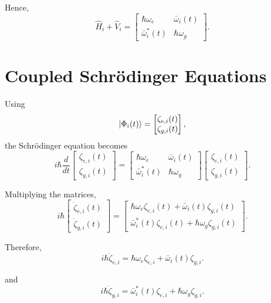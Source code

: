 \documentclass[12pt,a4paper]{article}
\begin{document}
Hence,
\begin{equation}
\boxed{
\hat H_i+\hat V_i
=
\begin{bmatrix}
\hbar\omega_e&\bar{\omega}_i(t)\\
\bar{\omega}_i^{*}(t)&\hbar\omega_g
\end{bmatrix}.
}
\tag{27}
\end{equation}

\section{Coupled Schr\"odinger Equations}

Using
\[
\ket{\Phi_i(t)}
=
\begin{bmatrix}
\zeta_{e,i}(t)\\
\zeta_{g,i}(t)
\end{bmatrix},
\]
the Schr\"odinger equation becomes
\[
i\hbar
\frac{d}{dt}
\begin{bmatrix}
\zeta_{e,i}(t)\\
\zeta_{g,i}(t)
\end{bmatrix}
=
\begin{bmatrix}
\hbar\omega_e&\bar{\omega}_i(t)\\
\bar{\omega}_i^{*}(t)&\hbar\omega_g
\end{bmatrix}
\begin{bmatrix}
\zeta_{e,i}(t)\\
\zeta_{g,i}(t)
\end{bmatrix}.
\]

Multiplying the matrices,
\[
i\hbar
\begin{bmatrix}
\dot{\zeta}_{e,i}(t)\\
\dot{\zeta}_{g,i}(t)
\end{bmatrix}
=
\begin{bmatrix}
\hbar\omega_e\zeta_{e,i}(t)
+
\bar{\omega}_i(t)\zeta_{g,i}(t)
\\[4pt]
\bar{\omega}_i^{*}(t)\zeta_{e,i}(t)
+
\hbar\omega_g\zeta_{g,i}(t)
\end{bmatrix}.
\]

Therefore,
\begin{equation}
\boxed{
i\hbar\dot{\zeta}_{e,i}
=
\hbar\omega_e\zeta_{e,i}
+
\bar{\omega}_i(t)\zeta_{g,i}.
}
\tag{28a}
\end{equation}

and
\begin{equation}
\boxed{
i\hbar\dot{\zeta}_{g,i}
=
\bar{\omega}_i^{*}(t)\zeta_{e,i}
+
\hbar\omega_g\zeta_{g,i}.
}
\tag{28b}
\end{equation}
\end{document}
